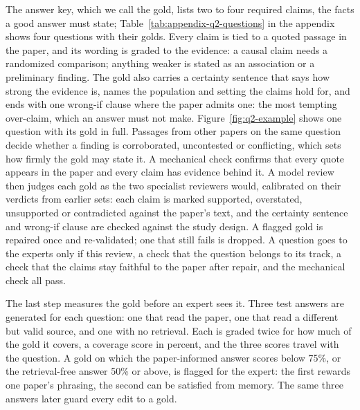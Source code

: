 \documentclass[sn-mathphys,Numbered]{sn-jnl}%
\begin{document}
The answer key, which we call the gold, lists two to four required claims, the facts a
good answer must state; Table~\ref{tab:appendix-q2-questions} in the appendix shows four
questions with their golds. Every claim is tied to a quoted passage in the paper, and its
wording is graded to the evidence: a causal claim needs a randomized comparison; anything
weaker is stated as an association or a preliminary finding. The gold also carries a
certainty sentence that says how strong the evidence is, names the population and
setting the claims hold for, and ends with one wrong-if clause where the paper admits
one: the most tempting over-claim, which an answer must not make. Figure~\ref{fig:q2-example} shows one
question with its gold in full. Passages from other papers on the same
question decide whether a finding is corroborated, uncontested or conflicting, which sets
how firmly the gold may state it. A mechanical check confirms that every quote appears in
the paper and every claim has evidence behind it. A model review then judges each gold
as the two specialist reviewers would, calibrated on their verdicts from earlier sets:
each claim is marked supported, overstated, unsupported or contradicted against the
paper's text, and the certainty sentence and wrong-if clause are checked against the
study design. A flagged gold is repaired once and re-validated; one that still fails is
dropped. A question goes to the experts only if this review, a
check that the question belongs to its track, a check that the claims stay faithful to
the paper after repair, and the mechanical check all pass.

The last step measures the gold before an expert sees it. Three test answers are
generated for each question: one that read the paper, one that read a different but
valid source, and one with no retrieval. Each is graded twice for how much of the gold
it covers, a coverage score in percent, and the three scores travel with the question.
A gold on which the paper-informed answer scores below 75\%, or the retrieval-free
answer 50\% or above, is flagged for the expert: the first rewards one paper's phrasing,
the second can be satisfied from memory. The same three answers later guard every edit
to a gold.
\end{document}
